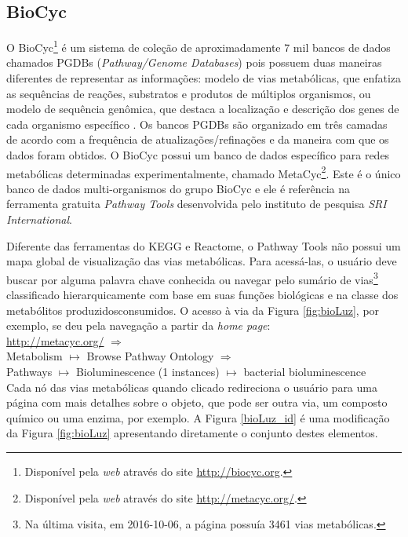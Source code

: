 
\subsection{BioCyc}

\indent O BioCyc\footnote{Disponível pela \textit{web} através do site \url{http://biocyc.org}.} é um sistema de coleção de aproximadamente 7 mil bancos de dados chamados PGDBs (\textit{Pathway/Genome Databases}) pois possuem duas maneiras diferentes de representar as informações: modelo de vias metabólicas, que enfatiza as sequências de reações, substratos e produtos de múltiplos organismos, ou modelo de sequência genômica, que destaca a localização e descrição dos genes de cada organismo específico \cite{biocycIntro}. Os bancos PGDBs são organizado em três camadas de acordo com a frequência de atualizações/refinações e da maneira com que os dados foram obtidos. O BioCyc possui um banco de dados específico para redes metabólicas determinadas experimentalmente, chamado MetaCyc\footnote{Disponível pela \textit{web} através do site \url{http://metacyc.org/}.}. Este é o único banco de dados multi-organismos do grupo BioCyc e ele é referência na ferramenta gratuita \textit{Pathway Tools} desenvolvida pelo instituto de pesquisa \textit{SRI International}.

\indent Diferente das ferramentas do KEGG e Reactome, o Pathway  Tools não possui um mapa global de visualização das vias metabólicas. Para acessá-las, o usuário deve buscar por alguma palavra chave conhecida ou navegar pelo sumário de vias\footnote{Na última visita, em 2016-10-06, a página possuía 3461 vias metabólicas.} classificado hierarquicamente com base em suas funções biológicas e na classe dos metabólitos produzidos\/consumidos. O acesso à via da Figura \ref{fig:bioLuz}, por exemplo, se deu pela navegação a partir da \textit{home page}: \\

\indent \url{http://metacyc.org/} $\Rightarrow$ \\
\indent Metabolism $\mapsto$ Browse Pathway Ontology $\Rightarrow$ \\
\indent Pathways $\mapsto$ Bioluminescence (1 instances) $\mapsto$ bacterial bioluminescence \\

\indent Cada nó das vias metabólicas quando clicado redireciona o usuário para uma página com mais detalhes sobre o objeto, que pode ser outra via, um composto químico ou uma enzima, por exemplo. A Figura \ref{bioLuz_id} é uma modificação da Figura \ref{fig:bioLuz} apresentando diretamente o conjunto destes elementos.

